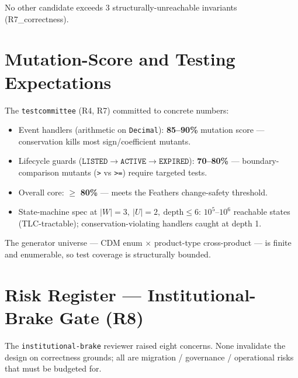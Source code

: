\documentclass[11pt,a4paper]{article}
\begin{document}
\noindent No other candidate exceeds 3 structurally-unreachable invariants (R7\_correctness).

\section{Mutation-Score and Testing Expectations}
\label{sec:mutationscore}

The \texttt{testcommittee} (R4, R7) committed to concrete numbers:

\begin{itemize}[leftmargin=*]
\item Event handlers (arithmetic on \texttt{Decimal}): \textbf{85--90\%} mutation score --- conservation kills most sign/coefficient mutants.
\item Lifecycle guards ($\texttt{LISTED} \to \texttt{ACTIVE} \to \texttt{EXPIRED}$): \textbf{70--80\%} --- boundary-comparison mutants (\texttt{>} vs \texttt{>=}) require targeted tests.
\item Overall core: $\geq$ \textbf{80\%} --- meets the Feathers change-safety threshold.
\item State-machine spec at $|W|=3,\ |U|=2,\ \text{depth}\leq 6$: $10^5$--$10^6$ reachable states (TLC-tractable); conservation-violating handlers caught at depth 1.
\end{itemize}

\noindent The generator universe --- CDM enum $\times$ product-type cross-product --- is finite and enumerable, so test coverage is structurally bounded.

\section{Risk Register --- Institutional-Brake Gate (R8)}
\label{sec:risk}

The \texttt{institutional-brake} reviewer raised eight concerns. None invalidate the design on correctness grounds; all are migration / governance / operational risks that must be budgeted for.
\end{document}
